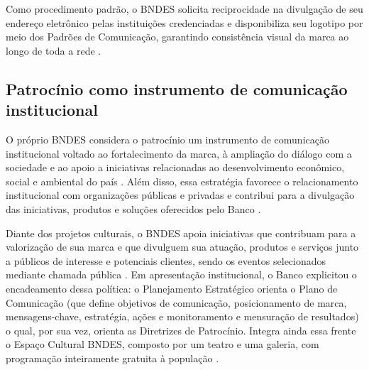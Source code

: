 Como procedimento padrão, o BNDES solicita reciprocidade na divulgação de seu endereço eletrônico pelas instituições credenciadas e disponibiliza seu logotipo por meio dos Padrões de Comunicação, garantindo consistência visual da marca ao longo de toda a rede \cite{bndes_orientacoes_divulgacao_2026}.

\subsection{Patrocínio como instrumento de comunicação institucional}

O próprio BNDES considera o patrocínio um instrumento de comunicação institucional voltado ao fortalecimento da marca, à ampliação do diálogo com a sociedade e ao apoio a iniciativas relacionadas ao desenvolvimento econômico, social e ambiental do país \cite{bndes_patrocinios_2026}. Além disso, essa estratégia favorece o relacionamento institucional com organizações públicas e privadas e contribui para a divulgação das iniciativas, produtos e soluções oferecidos pelo Banco \cite{bndes_patrocinios_2026}.

Diante dos projetos culturais, o BNDES apoia iniciativas que contribuam para a valorização de sua marca e que divulguem sua atuação, produtos e serviços junto a públicos de interesse e potenciais clientes, sendo os eventos selecionados mediante chamada pública \cite{bndes_patrocinios_2026}. Em apresentação institucional, o Banco explicitou o encadeamento dessa política: o Planejamento Estratégico orienta o Plano de Comunicação (que define objetivos de comunicação, posicionamento de marca, mensagens-chave, estratégia, ações e monitoramento e mensuração de resultados) o qual, por sua vez, orienta as Diretrizes de Patrocínio. Integra ainda essa frente o Espaço Cultural BNDES, composto por um teatro e uma galeria, com programação inteiramente gratuita à população \cite{bndes_patrocinios_2026}.